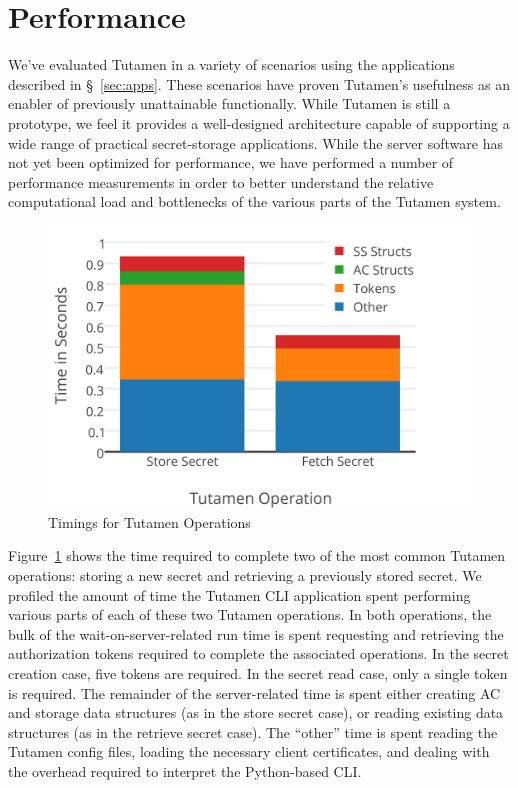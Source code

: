 \section{Performance}
\label{sec:performace}

We've evaluated Tutamen in a variety of scenarios using the
applications described in \S~\ref{sec:apps}. These scenarios have
proven Tutamen's usefulness as an enabler of previously unattainable
functionally. While Tutamen is still a prototype, we feel it provides
a well-designed architecture capable of supporting a wide range of
practical secret-storage applications. While the server software has
not yet been optimized for performance, we have performed a number of
performance measurements in order to better understand the relative
computational load and bottlenecks of the various parts of the Tutamen
system.

\begin{figure}[th]
  \centering
  \includegraphics[width=\columnwidth]{./figs/png/chart-timings.png}
  \caption{Timings for Tutamen Operations}
  \label{fig:eval:timings}
\end{figure}

Figure~\ref{fig:eval:timings} shows the time required to complete two
of the most common Tutamen operations: storing a new secret and
retrieving a previously stored secret. We profiled the amount of time
the Tutamen CLI application spent performing various parts of each of
these two Tutamen operations. In both operations, the bulk of the
wait-on-server-related run time is spent requesting and retrieving the
authorization tokens required to complete the associated
operations. In the secret creation case, five tokens are required. In
the secret read case, only a single token is required. The remainder of
the server-related time is spent either creating AC and storage data
structures (as in the store secret case), or reading existing data
structures (as in the retrieve secret case). The ``other'' time is
spent reading the Tutamen config files, loading the necessary client
certificates, and dealing with the overhead required to interpret the
Python-based CLI.

